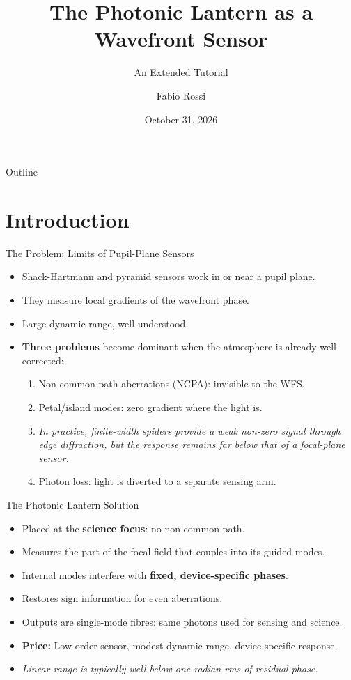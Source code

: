\documentclass[aspectratio=169,10pt]{beamer}
\title[The Photonic Lantern as a Wavefront Sensor]{The Photonic Lantern as a Wavefront Sensor}
\subtitle{An Extended Tutorial}
\author{Fabio Rossi}
\date{October 31, 2026}
\begin{document}
\begin{frame}
\titlepage
\end{frame}

\begin{frame}{Outline}
\tableofcontents
\end{frame}

\section{Introduction}
\begin{frame}{The Problem: Limits of Pupil-Plane Sensors}
\begin{itemize}
    \item Shack-Hartmann and pyramid sensors work in or near a pupil plane.
    \item They measure local gradients of the wavefront phase.
    \item Large dynamic range, well-understood.
    \item \textbf{Three problems} become dominant when the atmosphere is already well corrected:
    \begin{enumerate}
        \item Non-common-path aberrations (NCPA): invisible to the WFS.
        \item Petal/island modes: zero gradient where the light is.
        \item \emph{In practice, finite-width spiders provide a weak non-zero signal through edge diffraction, but the response remains far below that of a focal-plane sensor.}
        \item Photon loss: light is diverted to a separate sensing arm.
    \end{enumerate}
\end{itemize}
\end{frame}

\begin{frame}{The Photonic Lantern Solution}
\begin{itemize}
    \item Placed at the \textbf{science focus}: no non-common path.
    \item Measures the part of the focal field that couples into its guided modes.
    \item Internal modes interfere with \textbf{fixed, device-specific phases}.
    \item Restores sign information for even aberrations.
    \item Outputs are single-mode fibres: same photons used for sensing and science.
    \item \textbf{Price:} Low-order sensor, modest dynamic range, device-specific response.
    \item \emph{Linear range is typically well below one radian rms of residual phase.}
\end{itemize}
\end{frame}
\end{document}
